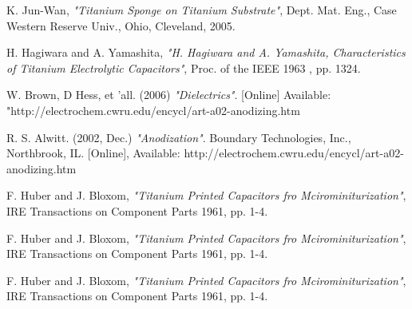 \documentclass[journal]{IEEEtran}
\begin{document}
                        
                        \begin{thebibliography}{1}

                         K. Jun-Wan, \emph{"Titanium Sponge on Titanium Substrate"}, Dept. Mat. Eng., Case Western Reserve Univ., Ohio, Cleveland, 2005.

                         H. Hagiwara and A. Yamashita, \emph{"H. Hagiwara and A. Yamashita, Characteristics of Titanium Electrolytic Capacitors"}, Proc. of the IEEE 1963 , pp. 1324.

                         W. Brown, D Hess, et 'all. (2006) \emph{"Dielectrics"}. [Online] Available: "http://electrochem.cwru.edu/encycl/art-a02-anodizing.htm

                         R. S. Alwitt. (2002, Dec.) \emph{"Anodization"}. Boundary Technologies, Inc., Northbrook, IL. [Online], Available: http://electrochem.cwru.edu/encycl/art-a02-anodizing.htm

                         F. Huber and J. Bloxom, \emph{"Titanium Printed Capacitors fro Mcirominiturization"}, IRE Transactions on Component Parts 1961, pp. 1-4.

                         F. Huber and J. Bloxom, \emph{"Titanium Printed Capacitors fro Mcirominiturization"}, IRE Transactions on Component Parts 1961, pp. 1-4.

                         F. Huber and J. Bloxom, \emph{"Titanium Printed Capacitors fro Mcirominiturization"}, IRE Transactions on Component Parts 1961, pp. 1-4.


\end{thebibliography} 
\end{document}
